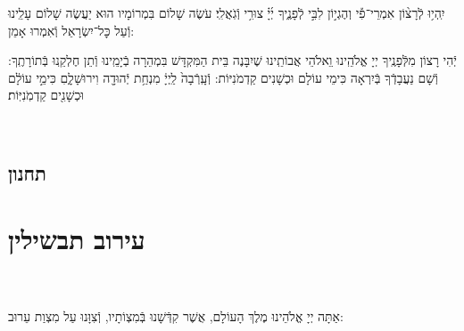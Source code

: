 \documentclass[twoside, openany, parskip=half, 11pt]{book}
\begin{document}
יִֽהְי֥וּ לְֿרָצ֨וֹן אִמְרֵי־פִ֡י וְהֶגְי֣וֹן לִבִּ֣י לְֿפָנֶ֑יךָ יְ֜יָ֗ צוּרִ֥י וְֿגֹֽאֲלִֽי׃ עֹשֶׂה שָׁלוֹם בִּמְרוֹמָיו הוּא יַעֲשֶׂה שָׁלוֹם עָלֵֽינוּ וְֿעַל כׇּל־יִשְׂרָאֵל וְֿאִמְרוּ אָמֵן:


\begin{small}

יְֿהִי רָצוֹן מִלְּֿפָנֶֽיךָ יְיָ אֱלֹהֵֽינוּ וִֵאלֹהֵי אֲבוֹתֵֽינוּ שֶׁיִבָּנֶה בֵּית הַמִּקְדָּשׁ בִּמְהֵרָה בְֿיָמֵֽינוּ וְֿתֵן חֶלְקֵֽנוּ בְּֿתוֹרָתֶֽךָ: וְֿשָׁם נַעֲבָדְֿךָ בְּֿיִרְאָה כִּימֵי עוֹלָם וּכְשָׁנִים קַדְמֹנִיּוֹת:
וְֿעָֽרְֿבָה֙ לַֽיְיָ֔ מִנְחַ֥ת יְֿהוּדָ֖ה וִירוּשָׁלָ֑םִ כִּימֵ֣י עוֹלָ֔ם וּכְשָׁנִ֖ים קַדְמֹֽנִיּֽוֹת׃


\end{small}



\\



\section[תחנון]{ תחנון }


\nefilasapayim

\shomeryisroel

\fullkaddish

\label{mincha aleinu}

\aleinu
\mournerskaddish

\vfill

\quad{}\quad{}

\chapter[עירוב תבשילין]{ עירוב תבשילין }

\\
\\
 אַתָּה יְיָ אֱלֹהֵינוּ מֶלֶךְ הָעוֹלָם, אֲשֶׁר קִדְּֿשָׁנוּ בְּֿמִצְוֹתָיו, וְֿצִוָּנוּ עַל מִצְוַת עֵרוּב:
\end{document}
